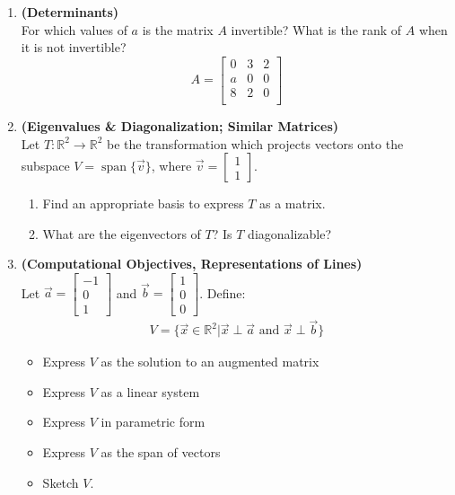 \documentclass[red]{tutorial}
\newcommand{\R}{\mathbb{R}}
\newcommand{\mat}[1]{\begin{bmatrix} #1 %
\end{bmatrix}}
\DeclareMathOperator{\Span} {span}
\theoremstyle{definition}
\theoremstyle{theorem}
\begin{document}
\begin{tutorial}
\begin{enumerate}
    \item \textbf{(Determinants)}\\
      For which values of $a$ is the matrix $A$ invertible? 
      What is the rank of $A$ when it is not invertible?
      \begin{equation*}
        A = 
        \begin{bmatrix}
          0 & 3 & 2 \\
          a & 0 & 0 \\
          8 & 2 & 0 \\
        \end{bmatrix}
      \end{equation*}
    \item \textbf{(Eigenvalues \& Diagonalization; Similar Matrices)}\\
      Let $T\colon\R^2\to\R^2$ be the transformation which projects vectors
      onto the subspace $V=\Span\{\vec v\}$, where $\vec v = \mat{1\\1}$.
      \begin{enumerate}
        \item Find an appropriate basis to express $T$ as a matrix.
        \item
          What are the eigenvectors of $T$? Is $T$ diagonalizable?
      \end{enumerate}
    \item \textbf{(Computational Objectives, Representations of Lines)}\\
      Let $\vec a = \mat{-1\\0\\1}$ and $\vec b = \mat{1\\0\\0}$. 
      Define:
      \begin{align*}
        V = \{\vec x\in \R^2| \vec x \perp \vec a \text{ and } 
        \vec x \perp \vec b\}
      \end{align*}
      \begin{itemize}
        \item Express $V$ as the solution to an augmented matrix
        \item Express $V$ as a linear system
        \item Express $V$ in parametric form
        \item Express $V$ as the span of vectors
        \item Sketch $V$.
      \end{itemize}
  \end{enumerate}
\end{tutorial}
\end{document}
